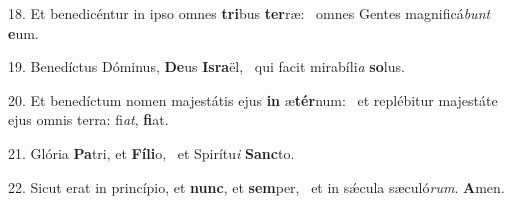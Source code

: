 18. Et benedicéntur in ipso omnes \textbf{tri}bus \textbf{ter}ræ: \ast\  omnes Gentes magnificá\textit{bunt} \textbf{e}um.\

19. Benedíctus Dóminus, \textbf{De}us \textbf{Is}\textbf{ra}ël, \ast\  qui facit mirabíli\textit{a} \textbf{so}lus.\

20. Et benedíctum nomen majestátis ejus \textbf{in} æ\textbf{tér}num: \ast\  et replébitur majestáte ejus omnis terra: fi\textit{at}, \textbf{fi}at.\

21. Glória \textbf{Pa}tri, et \textbf{Fí}\textbf{li}o, \ast\  et Spirítu\textit{i} \textbf{Sanc}to.\

22. Sicut erat in princípio, et \textbf{nunc}, et \textbf{sem}per, \ast\  et in sǽcula sæculó\textit{rum}. \textbf{A}men.\


